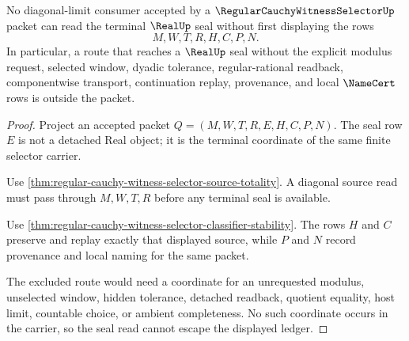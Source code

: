 \begin{theorem}
\label{thm:regular-cauchy-witness-selector-ledger-nonescape}
No diagonal-limit consumer accepted by a $\RegularCauchyWitnessSelectorUp$ packet can read the terminal $\RealUp$ seal without first displaying the rows
$$
M,W,T,R,H,C,P,N.
$$
In particular, a route that reaches a $\RealUp$ seal without the explicit modulus request, selected window, dyadic tolerance, regular-rational readback, componentwise transport, continuation replay, provenance, and local $\NameCert$ rows is outside the packet.
\end{theorem}
\begin{proof}
Project an accepted packet $Q=(M,W,T,R,E,H,C,P,N)$. The seal row $E$ is not a detached Real object; it is the terminal coordinate of the same finite selector carrier.

Use \autoref{thm:regular-cauchy-witness-selector-source-totality}. A diagonal source read must pass through $M,W,T,R$ before any terminal seal is available.

Use \autoref{thm:regular-cauchy-witness-selector-classifier-stability}. The rows $H$ and $C$ preserve and replay exactly that displayed source, while $P$ and $N$ record provenance and local naming for the same packet.

The excluded route would need a coordinate for an unrequested modulus, unselected window, hidden tolerance, detached readback, quotient equality, host limit, countable choice, or ambient completeness. No such coordinate occurs in the carrier, so the seal read cannot escape the displayed ledger.
\end{proof}

